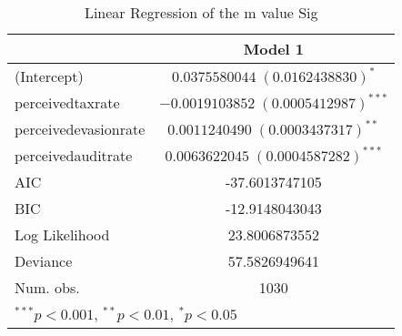 
\begin{table}
\begin{tabular}{l c }
\hline
 & Model 1 \\
\hline
(Intercept)          & $0.0375580044 \; (0.0162438830)^{*}$    \\
perceivedtaxrate     & $-0.0019103852 \; (0.0005412987)^{***}$ \\
perceivedevasionrate & $0.0011240490 \; (0.0003437317)^{**}$   \\
perceivedauditrate   & $0.0063622045 \; (0.0004587282)^{***}$  \\
\hline
AIC                  & -37.6013747105                          \\
BIC                  & -12.9148043043                          \\
Log Likelihood       & 23.8006873552                           \\
Deviance             & 57.5826949641                           \\
Num. obs.            & 1030                                    \\
\hline
\multicolumn{2}{l}{\scriptsize{$^{***}p<0.001$, $^{**}p<0.01$, $^*p<0.05$}}
\end{tabular}
\caption{Linear Regression of the m value Sig}
\label{table:coefficients}
\end{table}
